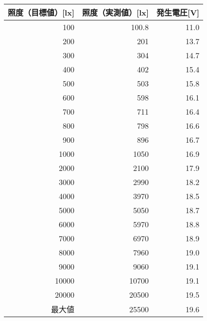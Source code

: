 \begin{tabular}{rrr}
\toprule
\multicolumn{1}{c}{照度（目標値）[lx]} & \multicolumn{1}{c}{照度（実測値）[lx]} & \multicolumn{1}{l}{発生電圧[V]} \\
\midrule
100   & 100.8 & 11.0 \\
200   & 201   & 13.7 \\
300   & 304   & 14.7 \\
400   & 402   & 15.4 \\
500   & 503   & 15.8 \\
600   & 598   & 16.1 \\
700   & 711   & 16.4 \\
800   & 798   & 16.6 \\
900   & 896   & 16.7 \\
1000  & 1050  & 16.9 \\
2000  & 2100  & 17.9 \\
3000  & 2990  & 18.2 \\
4000  & 3970  & 18.5 \\
5000  & 5050  & 18.7 \\
6000  & 5970  & 18.8 \\
7000  & 6970  & 18.9 \\
8000  & 7960  & 19.0 \\
9000  & 9060  & 19.1 \\
10000 & 10700 & 19.1 \\
20000 & 20500 & 19.5 \\
最大値   & 25500 & 19.6 \\
\bottomrule
\end{tabular}
